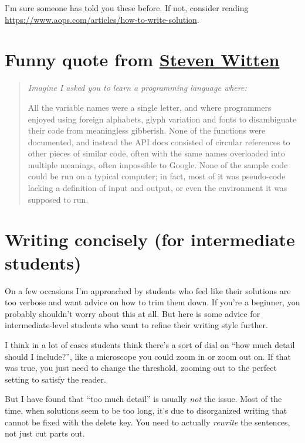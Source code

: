 \documentclass[11pt]{scrartcl}
\begin{document}
I'm sure someone has told you these before.
If not, consider reading
\url{https://www.aops.com/articles/how-to-write-solution}.

\section{Funny quote from \href{https://www.gleech.org/better-maths}{Steven Witten}}
\begin{quote}
  \slshape
  Imagine I asked you to learn a programming language where:
  \begin{itemize}
  \ii All the variable names were a single letter,
  and where programmers enjoyed using foreign alphabets,
  glyph variation and fonts to disambiguate their code from meaningless gibberish.
  \ii None of the functions were documented,
  and instead the API docs consisted of circular references to other pieces of similar code,
  often with the same names overloaded into multiple meanings, often impossible to Google.
  \ii None of the sample code could be run on a typical computer;
  in fact, most of it was pseudo-code lacking a definition of input and output,
  or even the environment it was supposed to run.
  \end{itemize}
\end{quote}

\newpage

\section{Writing concisely (for intermediate students)}
\renewcommand{\theequation}{\fnsymbol{equation}}
On a few occasions I'm approached by students who feel like their solutions
are too verbose and want advice on how to trim them down.
If you're a beginner, you probably shouldn't worry about this at all.
But here is some advice for intermediate-level students
who want to refine their writing style further.

I think in a lot of cases students think there's a sort of dial on
``how much detail should I include?'',
like a microscope you could zoom in or zoom out on.
If that was true, you just need to change the threshold,
zooming out to the perfect setting to satisfy the reader.

But I have found that ``too much detail'' is usually \emph{not} the issue.
Most of the time, when solutions seem to be too long,
\alert{it's due to disorganized writing that cannot be fixed with the delete key}.
You need to actually \emph{rewrite} the sentences, not just cut parts out.
\end{document}
